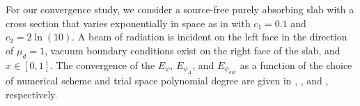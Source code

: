 For our convergence study, we consider a source-free purely absorbing slab with a cross section that varies exponentially in space as in  with $c_1 = 0.1$ and $c_2 = 2\ln(10)$.  
A beam of radiation is incident on the left face in the direction of $\mu_d=1$, vacuum boundary conditions exist on the right face of the slab, and $x\in[0, 1]$.  
The convergence of the $E_{\psi}$,  $E_{\psi_A}$, and $E_{\psi_{out}}$ as a function of the choice of numerical scheme and trial space polynomial degree are given in ,  , and , respectively.  
\begin{figure}[!htp]
\begin{center}
\end{center}
\end{figure}
